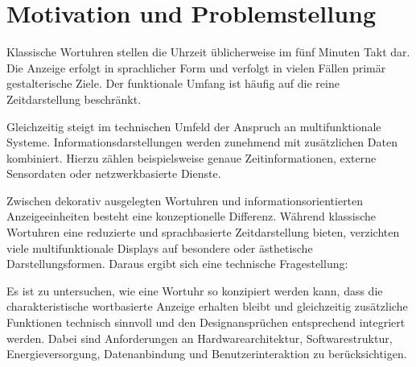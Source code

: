 \section{Motivation und Problemstellung}
Klassische Wortuhren stellen die Uhrzeit üblicherweise im fünf Minuten Takt dar. 
Die Anzeige erfolgt in sprachlicher Form und verfolgt in vielen Fällen primär gestalterische Ziele. 
Der funktionale Umfang ist häufig auf die reine Zeitdarstellung beschränkt. 

Gleichzeitig steigt im technischen Umfeld der Anspruch an multifunktionale Systeme. 
Informationsdarstellungen werden zunehmend mit zusätzlichen Daten kombiniert. 
Hierzu zählen beispielsweise genaue Zeitinformationen, externe Sensordaten oder netzwerkbasierte Dienste. 

Zwischen dekorativ ausgelegten Wortuhren und informationsorientierten Anzeigeeinheiten besteht eine konzeptionelle Differenz. 
Während klassische Wortuhren eine reduzierte und sprachbasierte Zeitdarstellung bieten, verzichten viele multifunktionale Displays auf besondere oder ästhetische Darstellungsformen. 
Daraus ergibt sich eine technische Fragestellung: 

Es ist zu untersuchen, wie eine Wortuhr so konzipiert werden kann, dass die charakteristische wortbasierte Anzeige erhalten bleibt und gleichzeitig zusätzliche Funktionen technisch sinnvoll und den Designansprüchen entsprechend integriert werden. 
Dabei sind Anforderungen an Hardwarearchitektur, Softwarestruktur, Energieversorgung, Datenanbindung und Benutzerinteraktion zu berücksichtigen. 